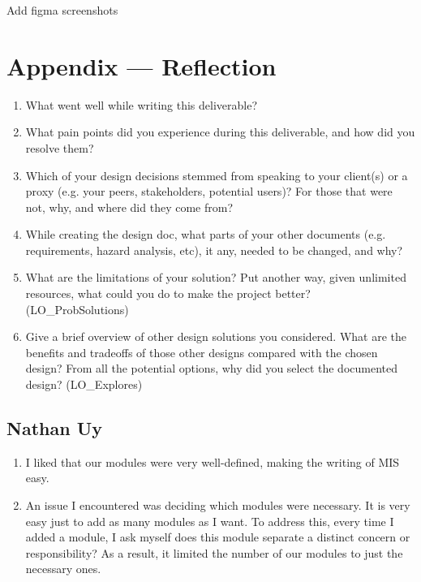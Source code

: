 \documentclass[12pt, titlepage]{article}
\begin{document}
Add figma screenshots




\newpage{}

\section*{Appendix --- Reflection}

\begin{enumerate}
  \item What went well while writing this deliverable? 
  \item What pain points did you experience during this deliverable, and how
    did you resolve them?
  \item Which of your design decisions stemmed from speaking to your client(s)
  or a proxy (e.g. your peers, stakeholders, potential users)? For those that
  were not, why, and where did they come from?
  \item While creating the design doc, what parts of your other documents (e.g.
  requirements, hazard analysis, etc), it any, needed to be changed, and why?
  \item What are the limitations of your solution?  Put another way, given
  unlimited resources, what could you do to make the project better? (LO\_ProbSolutions)
  \item Give a brief overview of other design solutions you considered.  What
  are the benefits and tradeoffs of those other designs compared with the chosen
  design?  From all the potential options, why did you select the documented design?
  (LO\_Explores)
\end{enumerate}

\subsection*{Nathan Uy}

\begin{enumerate}
    \item I liked that our modules were very well-defined, making the writing of MIS easy.
    \item An issue I encountered was deciding which modules were necessary. It is very easy just to add as many modules as I want. To address this, every time I added a module, I ask myself does this module separate a distinct concern or responsibility? As a result, it limited the number of our modules to just the necessary ones.
\end{enumerate}
\end{document}

